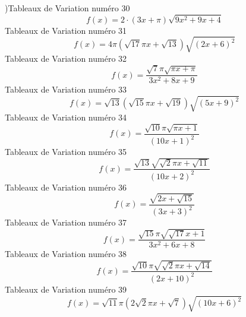\documentclass{article}
\begin{document}
\right)\]Tableaux de Variation num\'ero 30 \[f(x) = 2 \cdot \left(3 x + \pi\right) \sqrt{9 x^{2} + 9 x + 4}\]Tableaux de Variation num\'ero 31 \[f(x) = 4 \pi \left(\sqrt{17} \pi x + \sqrt{13}\right) \sqrt{\left(2 x + 6\right)^{2}}\]Tableaux de Variation num\'ero 32 \[f(x) = \frac{\sqrt{7} \pi \sqrt{\pi x + \pi}}{3 x^{2} + 8 x + 9}\]Tableaux de Variation num\'ero 33 \[f(x) = \sqrt{13} \left(\sqrt{15} \pi x + \sqrt{19}\right) \sqrt{\left(5 x + 9\right)^{2}}\]Tableaux de Variation num\'ero 34 \[f(x) = \frac{\sqrt{10} \pi \sqrt{\pi x + 1}}{\left(10 x + 1\right)^{2}}\]Tableaux de Variation num\'ero 35 \[f(x) = \frac{\sqrt{13} \sqrt{\sqrt{2} \pi x + \sqrt{11}}}{\left(10 x + 2\right)^{2}}\]Tableaux de Variation num\'ero 36 \[f(x) = \frac{\sqrt{2 x + \sqrt{15}}}{\left(3 x + 3\right)^{2}}\]Tableaux de Variation num\'ero 37 \[f(x) = \frac{\sqrt{15} \pi \sqrt{\sqrt{17} x + 1}}{3 x^{2} + 6 x + 8}\]Tableaux de Variation num\'ero 38 \[f(x) = \frac{\sqrt{10} \pi \sqrt{\sqrt{2} \pi x + \sqrt{14}}}{\left(2 x + 10\right)^{2}}\]Tableaux de Variation num\'ero 39 \[f(x) = \sqrt{11} \pi \left(2 \sqrt{2} \pi x + \sqrt{7}\right) \sqrt{\left(10 x + 6\right)^{2}}\]
\end{document}
